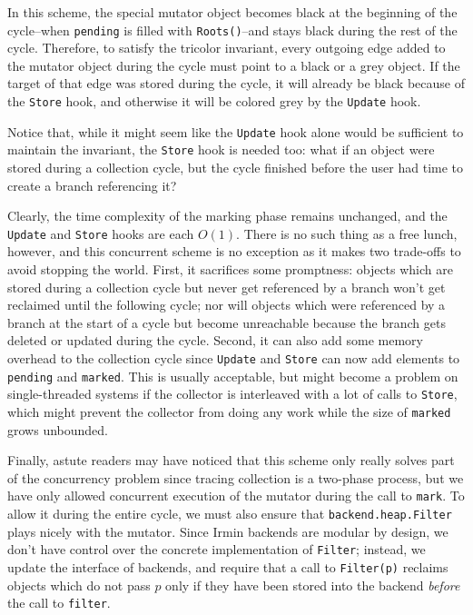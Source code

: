 In this scheme, the special mutator object becomes black at the beginning of the cycle--when \texttt{pending} is filled with \texttt{Roots()}--and stays black during the rest of the cycle. Therefore, to satisfy the tricolor invariant, every outgoing edge added to the mutator object during the cycle must point to a black or a grey object. If the target of that edge was stored during the cycle, it will already be black because of the \texttt{Store} hook, and otherwise it will be colored grey by the \texttt{Update} hook.

Notice that, while it might seem like the \texttt{Update} hook alone would be sufficient to maintain the invariant, the \texttt{Store} hook is needed too: what if an object were stored during a collection cycle, but the cycle finished before the user had time to create a branch referencing it?

Clearly, the time complexity of the marking phase remains unchanged, and the \texttt{Update} and \texttt{Store} hooks are each \(O(1)\). There is no such thing as a free lunch, however, and this concurrent scheme is no exception as it makes two trade-offs to avoid stopping the world. First, it sacrifices some promptness: objects which are stored during a collection cycle but never get referenced by a branch won't get reclaimed until the following cycle; nor will objects which were referenced by a branch at the start of a cycle but become unreachable because the branch gets deleted or updated during the cycle. Second, it can also add some memory overhead to the collection cycle since \texttt{Update} and \texttt{Store} can now add elements to \texttt{pending} and \texttt{marked}. This is usually acceptable, but might become a problem on single-threaded systems if the collector is interleaved with a lot of calls to \texttt{Store}, which might prevent the collector from doing any work while the size of \texttt{marked} grows unbounded.

Finally, astute readers may have noticed that this scheme only really solves part of the concurrency problem since tracing collection is a two-phase process, but we have only allowed concurrent execution of the mutator during the call to \texttt{mark}. To allow it during the entire cycle, we must also ensure that \texttt{backend.heap.Filter} plays nicely with the mutator. Since Irmin backends are modular by design, we don't have control over the concrete implementation of \texttt{Filter}; instead, we update the interface of backends, and require that a call to \texttt{Filter(p)} reclaims objects which do not pass \(p\) only if they have been stored into the backend \emph{before} the call to \texttt{filter}.

